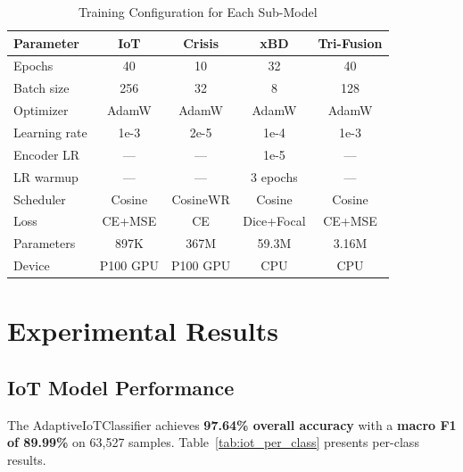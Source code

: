 \documentclass[journal]{IEEEtran}
\begin{document}
\begin{table}[!t]
\centering
\caption{Training Configuration for Each Sub-Model}
\label{tab:training_config}
\begin{tabular}{lcccc}
\toprule
\textbf{Parameter} & \textbf{IoT} & \textbf{Crisis} & \textbf{xBD} & \textbf{Tri-Fusion} \\
\midrule
Epochs & 40 & 10 & 32 & 40 \\
Batch size & 256 & 32 & 8 & 128 \\
Optimizer & AdamW & AdamW & AdamW & AdamW \\
Learning rate & 1e-3 & 2e-5 & 1e-4 & 1e-3 \\
Encoder LR & --- & --- & 1e-5 & --- \\
LR warmup & --- & --- & 3 epochs & --- \\
Scheduler & Cosine & CosineWR & Cosine & Cosine \\
Loss & CE+MSE & CE & Dice+Focal & CE+MSE \\
Parameters & 897K & 367M & 59.3M & 3.16M \\
Device & P100 GPU & P100 GPU & CPU & CPU \\
\bottomrule
\end{tabular}
\end{table}

\section{Experimental Results}

\subsection{IoT Model Performance}

The AdaptiveIoTClassifier achieves \textbf{97.64\% overall accuracy} with a \textbf{macro F1 of 89.99\%} on 63,527 samples. Table~\ref{tab:iot_per_class} presents per-class results.
\end{document}
